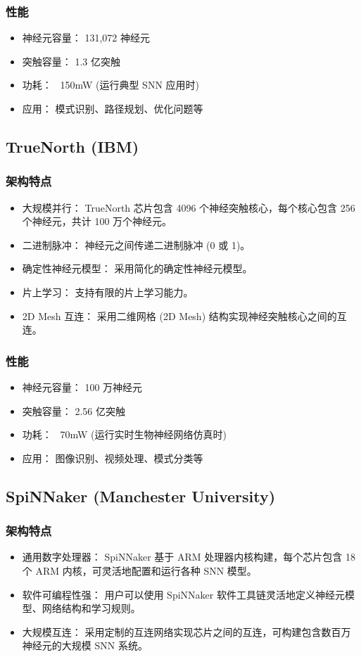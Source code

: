 \documentclass[12pt, a4paper, oneside]{ctexart}
\numberwithin{equation}{section}  %
\begin{document}
\subsubsection{性能}
\begin{itemize}
    \item 神经元容量： 131,072 神经元
    \item 突触容量： 1.3 亿突触
    \item 功耗： ~150mW (运行典型 SNN 应用时)
    \item 应用： 模式识别、路径规划、优化问题等
\end{itemize}
\subsection{TrueNorth (IBM)}
\subsubsection{架构特点}
\begin{itemize}
    \item 大规模并行： TrueNorth 芯片包含 4096 个神经突触核心，每个核心包含 256 个神经元，共计 100 万个神经元。
    \item 二进制脉冲： 神经元之间传递二进制脉冲 (0 或 1)。
    \item 确定性神经元模型： 采用简化的确定性神经元模型。
    \item 片上学习： 支持有限的片上学习能力。
    \item 2D Mesh 互连： 采用二维网格 (2D Mesh) 结构实现神经突触核心之间的互连。
\end{itemize}
\subsubsection{性能}
\begin{itemize}
    \item 神经元容量： 100 万神经元
    \item 突触容量： 2.56 亿突触
    \item 功耗： ~70mW (运行实时生物神经网络仿真时)
    \item 应用： 图像识别、视频处理、模式分类等
\end{itemize}
\subsection{SpiNNaker (Manchester University)}
\subsubsection{架构特点}
\begin{itemize}
    \item 通用数字处理器： SpiNNaker 基于 ARM 处理器内核构建，每个芯片包含 18 个 ARM 内核，可灵活地配置和运行各种 SNN 模型。
    \item 软件可编程性强： 用户可以使用 SpiNNaker 软件工具链灵活地定义神经元模型、网络结构和学习规则。
    \item 大规模互连： 采用定制的互连网络实现芯片之间的互连，可构建包含数百万神经元的大规模 SNN 系统。
\end{itemize}
\end{document}
